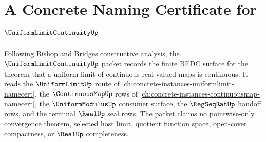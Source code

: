 \chapter{A Concrete Naming Certificate for $\UniformLimitContinuityUp$}
\label{ch:concrete-instances-uniform-limit-continuity-namecert}

Following Bishop and Bridges constructive analysis, the $\UniformLimitContinuityUp$ packet records the finite BEDC surface for the theorem that a uniform limit of continuous real-valued maps is continuous. It reads the $\UniformLimitUp$ route of \autoref{ch:concrete-instances-uniformlimit-namecert}, the $\ContinuousMapUp$ rows of \autoref{ch:concrete-instances-continuousmap-namecert}, the $\UniformModulusUp$ consumer surface, the $\RegSeqRatUp$ handoff rows, and the terminal $\RealUp$ seal rows. The packet claims no pointwise-only convergence theorem, selected host limit, quotient function space, open-cover compactness, or $\RealUp$ completeness.

